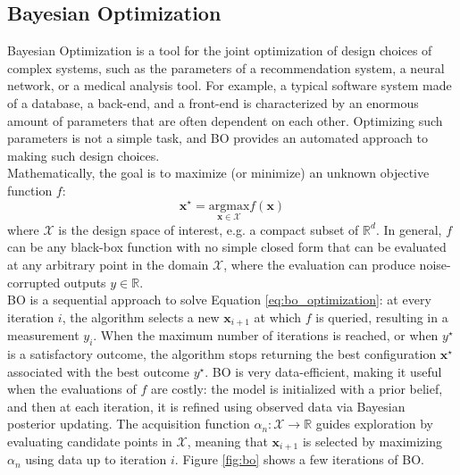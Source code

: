\documentclass[a4paper, 12pt]{article} %
\begin{document}
	\subsection{Bayesian Optimization } \label{ssec:bayesian_optimization}
	Bayesian Optimization \cite{BO} is a tool for the joint optimization of design choices of complex systems, such as the parameters of a recommendation system, a neural network, or a medical analysis tool. For example, a typical software system made of a database, a back-end, and a front-end is characterized by an enormous amount of parameters that are often dependent on each other.
	Optimizing such parameters is not a simple task, and BO provides an automated approach to making such design choices.\\
	
	Mathematically, the goal is to maximize (or minimize) an unknown objective function $f$:\\
	\begin{equation} \label{eq:bo_optimization}
		\pmb{x}^\star = \underset{\pmb{x} \in \mathcal{X}}{\mathrm{argmax}} f(\pmb{x})
	\end{equation}
	where $\mathcal{X}$ is the design space of interest, e.g. a compact subset of $\mathbb{R}^d$. In general, $f$ can be any black-box function with no simple closed form that can be evaluated at any arbitrary point in the domain $\mathcal{X}$, where the evaluation can produce noise-corrupted outputs $y \in \mathbb{R}$.\\
	BO is a sequential approach to solve Equation \ref{eq:bo_optimization}: at every iteration $i$, the algorithm selects a new $\pmb{x}_{i+1}$ at which $f$ is queried, resulting in a measurement $y_i$. When the maximum number of iterations is reached, or when $y^\star$ is a satisfactory outcome, the algorithm stops returning the best configuration $\pmb{x}^\star$ associated with the best outcome $y^\star$. BO is very data-efficient, making it useful when the evaluations of $f$ are costly: the model is initialized with a prior belief, and then at each iteration, it is refined using observed data via Bayesian posterior updating. The acquisition function $\alpha_n : \mathcal{X} \rightarrow \mathbb{R}$ guides exploration by evaluating candidate points in $\mathcal{X}$, meaning that $\pmb{x}_{i+1}$ is selected by maximizing $\alpha_n$ using data up to iteration $i$. Figure \ref{fig:bo} shows a few iterations of BO.
\end{document}
